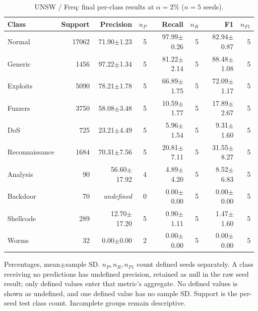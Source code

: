 \begin{table}[t]
\centering\scriptsize
\setlength{\tabcolsep}{3.3pt}
\caption{UNSW / Freq: final per-class results at $\alpha=2\%$ ($n=5$ seeds).}\label{tab:forgetting-class-unsw_nb15-freq}
\begin{tabular}{lrrrrrrr}
\toprule
Class & Support & Precision & $n_P$ & Recall & $n_R$ & F1 & $n_{F1}$ \\
\midrule
Normal & 17062 & 71.90$\pm$1.23 & 5 & 97.99$\pm$0.26 & 5 & 82.94$\pm$0.87 & 5 \\
Generic & 1456 & 97.22$\pm$1.34 & 5 & 81.22$\pm$2.14 & 5 & 88.48$\pm$1.08 & 5 \\
Exploits & 5090 & 78.21$\pm$1.78 & 5 & 66.89$\pm$1.75 & 5 & 72.09$\pm$1.17 & 5 \\
Fuzzers & 3750 & 58.08$\pm$3.48 & 5 & 10.59$\pm$1.77 & 5 & 17.89$\pm$2.67 & 5 \\
DoS & 725 & 23.21$\pm$4.49 & 5 & 5.96$\pm$1.54 & 5 & 9.31$\pm$1.60 & 5 \\
Reconnaissance & 1684 & 70.31$\pm$7.56 & 5 & 20.81$\pm$7.11 & 5 & 31.55$\pm$8.27 & 5 \\
Analysis & 90 & 56.60$\pm$17.92 & 4 & 4.89$\pm$4.20 & 5 & 8.52$\pm$6.83 & 5 \\
Backdoor & 70 & \textit{undefined} & 0 & 0.00$\pm$0.00 & 5 & 0.00$\pm$0.00 & 5 \\
Shellcode & 289 & 12.70$\pm$17.20 & 5 & 0.90$\pm$1.11 & 5 & 1.47$\pm$1.60 & 5 \\
Worms & 32 & 0.00$\pm$0.00 & 2 & 0.00$\pm$0.00 & 5 & 0.00$\pm$0.00 & 5 \\
\bottomrule
\end{tabular}
\par\smallskip\begin{minipage}{0.98\textwidth}\scriptsize Percentages, mean$\pm$sample SD. $n_P,n_R,n_{F1}$ count defined seeds separately. A class receiving no predictions has undefined precision, retained as null in the raw seed result; only defined values enter that metric's aggregate. No defined values is shown as undefined, and one defined value has no sample SD. Support is the per-seed test class count. Incomplete groups remain descriptive.\end{minipage}
\end{table}

